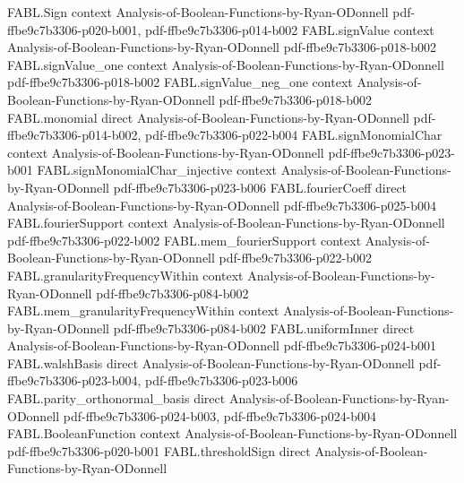 \begin{theorem}
\label{FABL.rankingPreference_isNAE3}
\leanok
{}
\proofstep
  {FABL.Sign}
  {context}
  {Analysis-of-Boolean-Functions-by-Ryan-ODonnell}
  {pdf-ffbe9c7b3306-p020-b001,
    pdf-ffbe9c7b3306-p014-b002}
\proofstep
  {FABL.signValue}
  {context}
  {Analysis-of-Boolean-Functions-by-Ryan-ODonnell}
  {pdf-ffbe9c7b3306-p018-b002}
\proofstep
  {FABL.signValue_one}
  {context}
  {Analysis-of-Boolean-Functions-by-Ryan-ODonnell}
  {pdf-ffbe9c7b3306-p018-b002}
\proofstep
  {FABL.signValue_neg_one}
  {context}
  {Analysis-of-Boolean-Functions-by-Ryan-ODonnell}
  {pdf-ffbe9c7b3306-p018-b002}
\proofstep
  {FABL.monomial}
  {direct}
  {Analysis-of-Boolean-Functions-by-Ryan-ODonnell}
  {pdf-ffbe9c7b3306-p014-b002,
    pdf-ffbe9c7b3306-p022-b004}
\proofstep
  {FABL.signMonomialChar}
  {context}
  {Analysis-of-Boolean-Functions-by-Ryan-ODonnell}
  {pdf-ffbe9c7b3306-p023-b001}
\proofstep
  {FABL.signMonomialChar_injective}
  {context}
  {Analysis-of-Boolean-Functions-by-Ryan-ODonnell}
  {pdf-ffbe9c7b3306-p023-b006}
\proofstep
  {FABL.fourierCoeff}
  {direct}
  {Analysis-of-Boolean-Functions-by-Ryan-ODonnell}
  {pdf-ffbe9c7b3306-p025-b004}
\proofstep
  {FABL.fourierSupport}
  {context}
  {Analysis-of-Boolean-Functions-by-Ryan-ODonnell}
  {pdf-ffbe9c7b3306-p022-b002}
\proofstep
  {FABL.mem_fourierSupport}
  {context}
  {Analysis-of-Boolean-Functions-by-Ryan-ODonnell}
  {pdf-ffbe9c7b3306-p022-b002}
\proofstep
  {FABL.granularityFrequencyWithin}
  {context}
  {Analysis-of-Boolean-Functions-by-Ryan-ODonnell}
  {pdf-ffbe9c7b3306-p084-b002}
\proofstep
  {FABL.mem_granularityFrequencyWithin}
  {context}
  {Analysis-of-Boolean-Functions-by-Ryan-ODonnell}
  {pdf-ffbe9c7b3306-p084-b002}
\proofstep
  {FABL.uniformInner}
  {direct}
  {Analysis-of-Boolean-Functions-by-Ryan-ODonnell}
  {pdf-ffbe9c7b3306-p024-b001}
\proofstep
  {FABL.walshBasis}
  {direct}
  {Analysis-of-Boolean-Functions-by-Ryan-ODonnell}
  {pdf-ffbe9c7b3306-p023-b004,
    pdf-ffbe9c7b3306-p023-b006}
\proofstep
  {FABL.parity_orthonormal_basis}
  {direct}
  {Analysis-of-Boolean-Functions-by-Ryan-ODonnell}
  {pdf-ffbe9c7b3306-p024-b003,
    pdf-ffbe9c7b3306-p024-b004}
\proofstep
  {FABL.BooleanFunction}
  {context}
  {Analysis-of-Boolean-Functions-by-Ryan-ODonnell}
  {pdf-ffbe9c7b3306-p020-b001}
\proofstep
  {FABL.thresholdSign}
  {direct}
  {Analysis-of-Boolean-Functions-by-Ryan-ODonnell}

\end{theorem}

